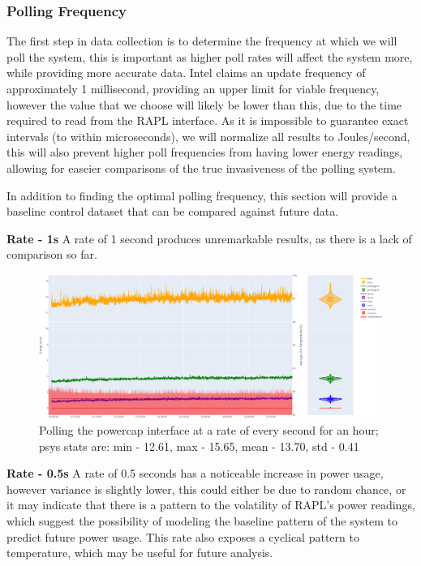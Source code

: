 \subsubsection{Polling Frequency}
The first step in data collection is to determine the frequency at which we will poll the system, this is important as
higher poll rates will affect the system more, while providing more accurate data.
Intel claims an update frequency of approximately 1 millisecond\cite{RAPLInterface}, providing an upper limit for viable
frequency, however the value that we choose will likely be lower than this, due to the time required to read from the
RAPL interface.
As it is impossible to guarantee exact intervals (to within microseconds), we will normalize all results to
Joules/second, this will also prevent higher poll frequencies from having lower energy readings, allowing for easeier
comparisons of the true invasiveness of the polling system.

In addition to finding the optimal polling frequency, this section will provide a baseline control dataset that can be
compared against future data.

\textbf{Rate - 1s}
A rate of 1 second produces unremarkable results, as there is a lack of comparison so far.

\begin{figure}[H]
\centering
\includegraphics[width=15cm]{figures/implementation/control_sytemd10}
\caption{Polling the powercap interface at a rate of every second for an hour; psys stats are: min - 12.61, max - 15.65, mean - 13.70, std - 0.41}
\label{fig:systemd10ratetest}
\end{figure}

\textbf{Rate - 0.5s}
A rate of 0.5 seconds has a noticeable increase in power usage, however variance is slightly lower, this could either be
due to random chance, or it may indicate that there is a pattern to the volatility of RAPL's power readings, which
suggest the possibility of modeling the baseline pattern of the system to predict future power usage.
This rate also exposes a cyclical pattern to temperature, which may be useful for future analysis.

